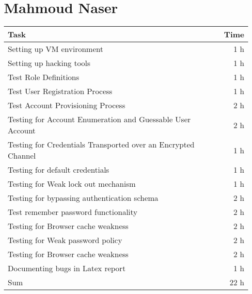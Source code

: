 \section*{Mahmoud Naser}
\begin{table}[h!tpb]
  \centering
  \begin{tabularx}{\textwidth}{X r}
    \toprule
      Task & Time \\
    \midrule
      Setting up VM environment & 1 h \\
      Setting up hacking tools & 1 h \\

      Test Role Definitions & 1 h \\
      Test User Registration Process & 1 h \\
      Test Account Provisioning Process & 2 h \\
      Testing for Account Enumeration and Guessable User Account & 2 h \\

      Testing for Credentials Transported over an Encrypted Channel & 1 h \\
      Testing for default credentials & 1 h \\
      Testing for Weak lock out mechanism & 1 h \\
      Testing for bypassing authentication schema & 2 h \\
      Test remember password functionality & 2 h \\
      Testing for Browser cache weakness & 2 h \\
      Testing for Weak password policy & 2 h \\
      Testing for Browser cache weakness & 2 h \\

      Documenting bugs in Latex report & 1 h \\
    \midrule
      Sum & 22 h \\
    \bottomrule
  \end{tabularx}
\end{table}
